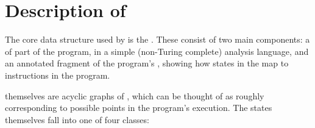 \label{chapter:derive_manip}
\section{Description of \StateMachines}
\label{sect:derive:description}


The core data structure used by {\technique} is the \StateMachine.
These consist of two main components: a
of part of the program, in a simple (non-Turing complete) analysis
language, and an annotated fragment of the program's
, showing how states in the
 map to instructions in the program.

 themselves are acyclic graphs of
, which can be thought of as roughly
corresponding to possible points in the program's execution.  The
states themselves fall into one of four classes:

